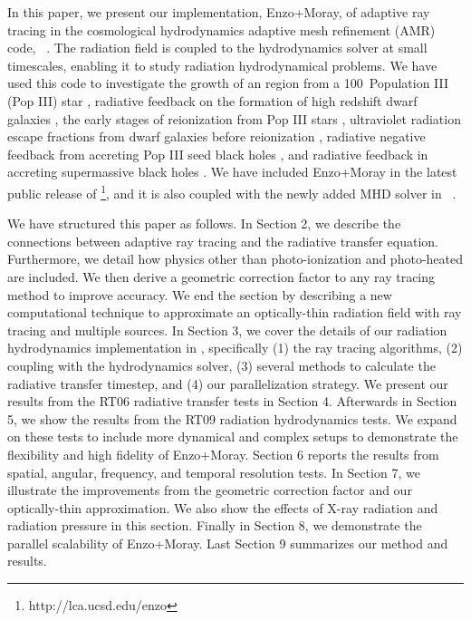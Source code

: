 \documentclass[apj,onecolumn]{emulateapj}
\begin{document}
In this paper, we present our implementation, Enzo+Moray, of adaptive
ray tracing \citep{Abel02_RT} in the cosmological hydrodynamics
adaptive mesh refinement (AMR) code, \enzo~\citep{BryanNorman1997,
  OShea2004}.  The radiation field is coupled to the hydrodynamics
solver at small timescales, enabling it to study radiation
hydrodynamical problems.  We have used this code to investigate the
growth of an  region from a 100\Ms~Population III (Pop III)
star \citep{Abel07}, radiative feedback on the formation of high
redshift dwarf galaxies \citep{Wise08_Gal}, the early stages of
reionization from Pop III stars \citep{Wise08_Reion}, ultraviolet
radiation escape fractions from dwarf galaxies before reionization
\citep{Wise09}, radiative negative feedback from accreting Pop III
seed black holes \citep{Alvarez09}, and radiative feedback in
accreting supermassive black holes \citep[][in prep.]{Kim11}.  We have
included Enzo+Moray in the latest public release of
\enzo\footnote{http://lca.ucsd.edu/enzo}, and it is also coupled with
the newly added MHD solver in \enzo~\citep{Wang09}.

We have structured this paper as follows.  In Section 2, we describe
the connections between adaptive ray tracing and the radiative
transfer equation.  Furthermore, we detail how physics other than
photo-ionization and photo-heated are included.  We then derive a
geometric correction factor to any ray tracing method to improve
accuracy.  We end the section by describing a new computational
technique to approximate an optically-thin radiation field with ray
tracing and multiple sources.  In Section 3, we cover the details of
our radiation hydrodynamics implementation in \enzo, specifically (1)
the ray tracing algorithms, (2) coupling with the hydrodynamics
solver, (3) several methods to calculate the radiative transfer
timestep, and (4) our parallelization strategy.  We present our
results from the RT06 radiative transfer tests in Section 4.
Afterwards in Section 5, we show the results from the RT09 radiation
hydrodynamics tests.  We expand on these tests to include more
dynamical and complex setups to demonstrate the flexibility and high
fidelity of Enzo+Moray.  Section 6 reports the results from spatial,
angular, frequency, and temporal resolution tests.  In Section 7, we
illustrate the improvements from the geometric correction factor and
our optically-thin approximation.  We also show the effects of X-ray
radiation and radiation pressure in this section.  Finally in Section
8, we demonstrate the parallel scalability of Enzo+Moray.  Last
Section 9 summarizes our method and results.
\end{document}
